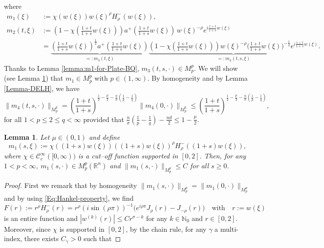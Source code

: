 \documentclass[10pt]{article}
\newtheorem{lemma}{Lemma}[section]
\newcommand{\<}{\langle}
\renewcommand{\>}{\rangle}
\numberwithin{equation}{section}
\begin{document}
\begin{itemize}
\begin{align*}
\end{align*}
where
\begin{align*}
m_1(\xi) &:= \chi(w(\xi))w(\xi)^{\rho}H^{-}_{\rho}(w(\xi)), \\
m_2(t,\xi) &:=\left( 1-\chi\left(\frac{1+t}{1+s}w(\xi)\right) \right)a^{+}\left(\frac{1+t}{1+s}w(\xi)\right)\,w(\xi)^{-\rho} e^{i\frac{1+t}{1+s}w(\xi)} \\
&= \underbrace{\left(\frac{1+t}{1+s}w(\xi)\right)^{\frac12}a^{+}\left(\frac{1+t}{1+s}w(\xi)\right)}_{=:m_3(t,\xi)}\underbrace{ \left(1- \chi\left(\frac{1+t}{1+s}w(\xi)\right) \right) w(\xi)^{-\rho}\big(\frac{1+t}{1+s}w(\xi)\big)^{-\frac{1}{2}}e^{i\frac{1+t}{1+s}w(\xi)}}_{=:m_4(t,s, \xi)}.
\end{align*}
Thanks to  Lemma \ref{lemma:m1-for-Plate-BQ}, $m_3(t, s,\cdot)\in M_p^p$. We will show (see Lemma \ref{lemmaM1}) that $m_1\in M_p^p$ with $p\in (1, \infty)$.  %
 By homogeneity and by Lemma \ref{Lemma-DELH}, we have
\[\|m_4(t,s, \cdot)\|_{M_p^q} =\left(\frac{1+t}{1+s}\right)^{\frac{1}{2}-\frac{\mu}{2}-\frac{n}{\sigma}\left(\frac1p-\frac1q\right)}\|m_4(0,\cdot)\|_{M_p^q} \leq \left(\frac{1+t}{1+s}\right)^{\frac{1}{2}-\frac{\mu}{2}-\frac{n}{\sigma}\left(\frac1p-\frac1q\right)} , \]
for all $1< p\leq 2\leq q<\infty$ provided that $\frac{n}{\sigma}\left(\frac1p-\frac1q\right)- \frac{nd}{2}\leq 1-\frac{\mu}{2}$.
%
\begin{lemma}\label{lemmaM1}
Let $\mu\in(0,1)$ and define
\[ m_1(s,\xi) := \chi((1+s)w(\xi))((1+s)w(\xi))^{\rho} H^{-}_{\rho}((1+s)w(\xi)), \]
where $\chi\in \mathcal{C}_c^\infty([0,\infty))$ is a cut--off function supported in $[0,2]$. Then, for any $1<p<\infty$, $m_1(s,\cdot)\in M_p^p(\mathbb{R}^n)$ and $ \|m_1(s,\cdot)\|_{M_p^p}\leq C$ for all $s\geq 0$.
\end{lemma}
\begin{proof}
First we remark that by homogeneity $\|m_1(s,\cdot)\|_{M_p^p}=\|m_1(0,\cdot)\|_{M_p^p}$ and by using \eqref{Eq:Hankel-property}, we find
\[ F(r):=r^{\rho} H^{-}_{\rho}(r)= r^{\rho}(i\sin(\rho\pi))^{-1}\big(e^{i\rho \pi}  J_{\rho}(r)-J_{-\rho}(r) \big) \quad \text{with} \quad r:=w(\xi)
\]
is an entire function  and $|w^{(k)}(r)|\leq C r^{\sigma-k}$ for any $k\in\mathbb{N}_0$ and $r\in [0,2]$. Moreover, since $\chi$ is supported in $[0,2]$, by the chain rule, for any $\gamma$ a multi-index, there exists $C_\gamma>0$ such that

\end{proof}
\end{itemize}
\end{document}
